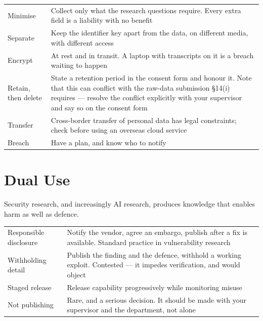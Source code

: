 \begin{center}
\small
\begin{tabular}{@{}L{3.4cm}L{10.9cm}@{}}
\toprule
Minimise        & Collect only what the research questions require. Every extra
                  field is a liability with no benefit \\
Separate        & Keep the identifier key apart from the data, on different
                  media, with different access \\
Encrypt         & At rest and in transit. A laptop with transcripts on it is a
                  breach waiting to happen \\
Retain, then delete & State a retention period in the consent form and honour
                  it. Note that this can conflict with the raw-data submission
                  \S14(i) requires --- resolve the conflict explicitly with
                  your supervisor and say so on the consent form \\
Transfer        & Cross-border transfer of personal data has legal constraints;
                  check before using an overseas cloud service \\
Breach          & Have a plan, and know who to notify \\
\bottomrule
\end{tabular}
\end{center}

\section{Dual Use}

Security research, and increasingly AI research, produces knowledge that
enables harm as well as defence.

\begin{center}
\small
\begin{tabular}{@{}L{3.6cm}L{10.7cm}@{}}
\toprule
Responsible disclosure
  & Notify the vendor, agree an embargo, publish after a fix is available.
    Standard practice in vulnerability research \\
Withholding detail
  & Publish the finding and the defence, withhold a working exploit. Contested
    --- it impedes verification, and  would object \\
Staged release
  & Release capability progressively while monitoring misuse \\
Not publishing
  & Rare, and a serious decision. It should be made with your supervisor and
    the department, not alone \\
\bottomrule
\end{tabular}
\end{center}

